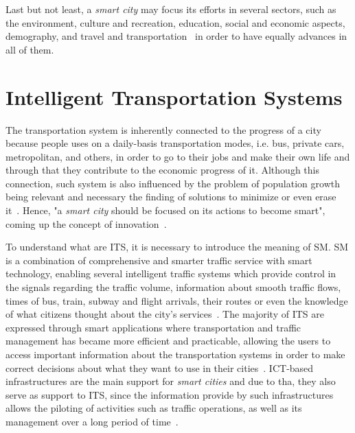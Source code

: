 Last but not least, a \textit{smart city} may focus its efforts in several sectors, such as the environment, culture and recreation, education, social and economic aspects, demography, and travel and transportation~\cite{caragliu2011smart} in order to have equally advances in all of them.

\section{Intelligent Transportation Systems}\label{sec:intelligent_transportation_systems}

The transportation system is inherently connected to the progress of a city because people uses on a daily-basis transportation modes, i.e. bus, private cars, metropolitan, and others, in order to go to their jobs and make their own life and through that they contribute to the economic progress of it. Although this connection, such system is also influenced by the problem of population growth being relevant and necessary the finding of solutions to minimize or even erase it~\cite{kn:Caragliu2015}. Hence, "a \textit{smart city} should be focused on its actions to become smart", coming up the concept of innovation~\cite{kn:Cecilia2016}.

To understand what are \gls{ITS}, it is necessary to introduce the meaning of \gls{SM}. \gls{SM} is a combination of comprehensive and smarter traffic service with smart technology, enabling several intelligent traffic systems which provide control in the signals regarding the traffic volume, information about smooth traffic flows, times of bus, train, subway and flight arrivals, their routes or even the knowledge of what citizens thought about the city's services~\cite{kn:Chun2015}. The majority of \gls{ITS} are expressed through smart applications where transportation and traffic management has became more efficient and practicable, allowing the users to access important information about the transportation systems in order to make correct decisions about what they want to use in their cities~\cite{kn:Caragliu2015}. \gls{ICT}-based infrastructures are the main support for \textit{smart cities} and due to tha, they also serve as support to \gls{ITS}, since the information provide by such infrastructures allows the piloting of activities such as traffic operations, as well as its  management over a long period of time~\cite{kn:Cecilia2016}.

